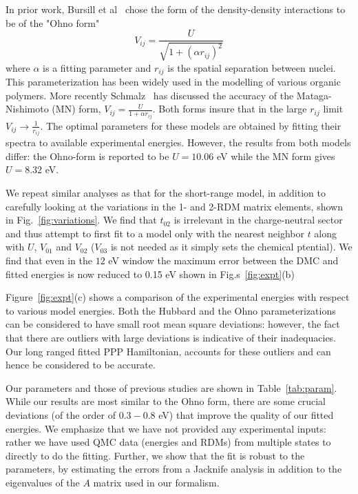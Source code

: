 \documentclass[aip,jcp,twocolumn,10pt]{revtex4-1}
\begin{document}
In prior work, Bursill et al~\cite{Bursill} chose the form of the 
density-density interactions to be of the "Ohno form"
\begin{equation}
	V_{ij}= \frac{U}{\sqrt{1 + (\alpha r_{ij})^{2}}}
\end{equation}
where $\alpha$ is a fitting parameter and $r_{ij}$ is the spatial 
separation between nuclei. This parameterization 
has been widely used in the modelling of various organic polymers. 
More recently Schmalz~\cite{Schmalz} has discussed 
the accuracy of the Mataga-Nishimoto (MN) form, 
$V_{ij}= \frac{U}{1 + \alpha r_{ij}}$. 
Both forms insure that in the large $r_{ij}$ limit $V_{ij} \rightarrow \frac{1} {r_{ij}}$. 
The optimal parameters for these models are obtained by fitting 
their spectra to available experimental energies.
However, the results from both models differ: the Ohno-form is reported to be $U=10.06 $ eV while 
the MN form gives $U=8.32$ eV. 

We repeat similar analyses as that for the short-range model, in addition
to carefully looking at the variations in the 1- and 2-RDM matrix 
elements, shown in Fig.~\ref{fig:variations}. We find that $t_{02}$ 
is irrelevant in the charge-neutral sector and thus attempt to first fit 
to a model only with the nearest neighbor $t$ along with $U$, $V_{01}$ and $V_{02}$ 
($V_{03}$ is not needed as it simply sets the chemical ptential). 
We find that even in the $12$ eV window the maximum error 
between the DMC and fitted energies 
is now reduced to 0.15 eV shown in Fig.s~\ref{fig:expt}(b)

Figure~\ref{fig:expt}(c) shows a comparison of the
experimental energies with respect to various model 
energies. Both the Hubbard and the Ohno parameterizations 
can be considered to have small root mean square deviations: however, 
the fact that there are outliers with large deviations 
is indicative of their inadequacies. Our
long ranged fitted PPP Hamiltonian, accounts for these outliers
and can hence be considered to be accurate.

Our parameters and those of previous studies are shown in Table~\ref{tab:param}. 
While our results are most similar to the Ohno form, there are some 
crucial deviations (of the order of $0.3- 0.8$ eV) that 
improve the quality of our fitted energies. We emphasize that 
we have not provided any experimental inputs: rather we have used QMC data (energies and RDMs) 
from multiple states to directly to do the fitting. 
Further, we show that the fit is robust to the parameters, 
by estimating the errors from a Jacknife analysis in addition to 
the eigenvalues of the $A$ matrix used in our formalism.
\end{document}
